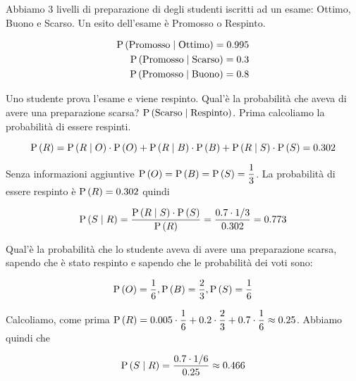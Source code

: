 \begin{exrc}
	Abbiamo 3 livelli di preparazione di degli studenti iscritti ad un esame: Ottimo, Buono e Scarso.
	Un esito dell'esame è Promosso o Respinto.
	
	\begin{equation*}
		\begin{aligned}
		\text{P}\left(\text{Promosso}  \mid  \text{Ottimo}\right) = 0.995\\
		\text{P}\left(\text{Promosso}  \mid  \text{Scarso}\right) = 0.3\\
		\text{P}\left(\text{Promosso}  \mid  \text{Buono}\right) = 0.8\\
		\end{aligned}
	\end{equation*}
	
	Uno studente prova l'esame e viene respinto. Qual'è la probabilità che aveva di avere una preparazione scarsa? $ \text{P}\left(\text{Scarso} \mid \text{Respinto}\right) $. Prima calcoliamo la probabilità di essere respinti.
	
	\begin{equation*}
	\text{P}\left(R\right) = \text{P}\left(R \mid O\right) \cdot \text{P}\left(O\right) + \text{P}\left(R  \mid  B\right) \cdot \text{P}\left(B\right) + \text{P}\left(R \mid S\right) \cdot \text{P}\left(S\right) = 0.302
	\end{equation*}
	
	Senza informazioni aggiuntive $ \text{P}\left(O\right) = \text{P}\left(B\right) = \text{P}\left(S\right) = \dfrac{1}{3} $. 
	La probabilità di essere respinto è $ \text{P}\left(R\right) = 0.302 $ quindi 
	
	\begin{equation*}
	\text{P}\left(S  \mid  R\right) = \dfrac{\text{P}\left(R \mid S\right)\cdot \text{P}\left(S\right)}{\text{P}\left(R\right)} = \dfrac{0.7 \cdot 1/3}{0.302} = 0.773
	\end{equation*}
\end{exrc}

\begin{exrc}
	Qual'è la probabilità che lo studente aveva di avere una preparazione scarsa, sapendo che è stato respinto e sapendo che le probabilità dei voti sono: 
	
	\begin{equation*}
		 \text{P}\left(O\right) = \dfrac{1}{6}, \text{P}\left(B\right) = \dfrac{2}{3}, \text{P}\left(S\right) = \dfrac{1}{6}
	\end{equation*}
	
	Calcoliamo, come prima $ \text{P}\left(R\right) = 0.005 \cdot \dfrac{1}{6} + 0.2 \cdot \dfrac{2}{3} + 0.7 \cdot \dfrac{1}{6} \approx 0.25 $. Abbiamo quindi che 
	
	\begin{equation*}
		\text{P}\left(S \mid R\right) = \dfrac{0.7 \cdot 1/6}{0.25} \approx 0.466
	\end{equation*}
\end{exrc}


